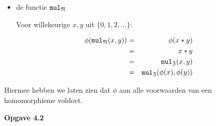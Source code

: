 \documentclass[a4paper,11pt]{article}
\begin{document}
\begin{enumerate}
\begin{itemize}
\item{de functie $\verb|mul|_{\mathfrak{N}}$}

  Voor willekeurige $x,y$ uit $\{0,1,2,\ldots\}$:

  \begin{eqnarray*}
    \phi(\verb|mul|_{\mathfrak{N}}(x,y)) & = & \phi(x*y) \\
                                         & = & x*y \\
                                         & = & \verb|mul|_{\mathfrak{Z}}(x,y) \\
                                         & = & \verb|mul|_{\mathfrak{Z}}(\phi(x),\phi(y))
  \end{eqnarray*}

\end{itemize}

Hiermee hebben we laten zien dat $\phi$ aan alle voorwaarden van een
homomorphisme voldoet.\\[2em]

\end{enumerate}


{\bf Opgave 4.2}
\end{document}
